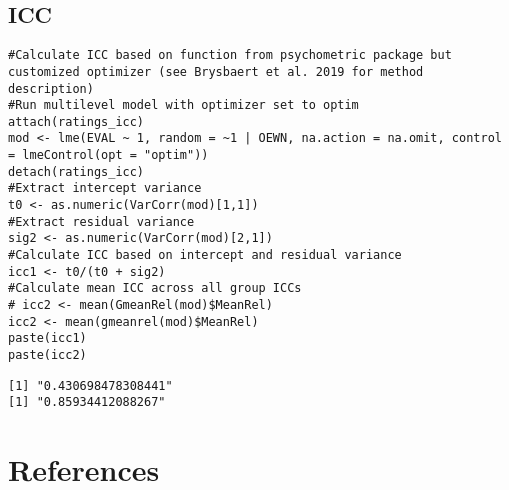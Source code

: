 \documentclass[a4paper,10pt,onecolumn,oneside,openright]{article}
\begin{document}
\subsection{ICC}
\label{sec:org69d1d18}
\begin{verbatim}
#Calculate ICC based on function from psychometric package but customized optimizer (see Brysbaert et al. 2019 for method description)
#Run multilevel model with optimizer set to optim
attach(ratings_icc)
mod <- lme(EVAL ~ 1, random = ~1 | OEWN, na.action = na.omit, control = lmeControl(opt = "optim"))
detach(ratings_icc)
#Extract intercept variance
t0 <- as.numeric(VarCorr(mod)[1,1])
#Extract residual variance
sig2 <- as.numeric(VarCorr(mod)[2,1])
#Calculate ICC based on intercept and residual variance
icc1 <- t0/(t0 + sig2)
#Calculate mean ICC across all group ICCs
# icc2 <- mean(GmeanRel(mod)$MeanRel)
icc2 <- mean(gmeanrel(mod)$MeanRel)
paste(icc1)
paste(icc2)
\end{verbatim}

\begin{verbatim}
[1] "0.430698478308441"
[1] "0.85934412088267"
\end{verbatim}

\section*{References}
\label{sec:orgcb7394d}

\printbibliography[heading=none]
\end{document}
